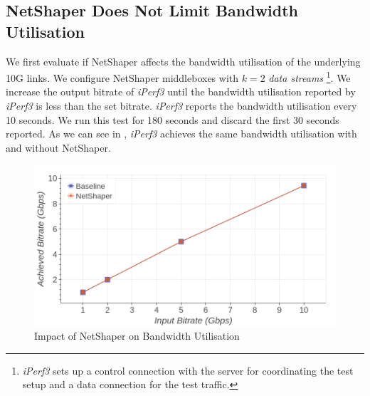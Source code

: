 \subsection{NetShaper Does Not Limit Bandwidth Utilisation}
\label{subsec:netshaper-evaluation-bw}

We first evaluate if NetShaper affects the bandwidth utilisation of the underlying 10G links.
We configure NetShaper middleboxes with $k = 2$ \textit{data streams}
\footnote{\textit{iPerf3} sets up a control connection with the server for coordinating the test setup and a data connection for the test traffic.}.
We increase the output bitrate of \textit{iPerf3} until the bandwidth utilisation reported by \textit{iPerf3} is less than the set bitrate.
\textit{iPerf3} reports the bandwidth utilisation every 10 seconds.
We run this test for 180 seconds and discard the first 30 seconds reported.
As we can see in , \textit{iPerf3} achieves the same bandwidth utilisation with and without NetShaper.

\begin{figure}[!htb]
    \centering
    \includegraphics[width=\columnwidth]{figures/netshaper/evaluation/bw.png}
    \caption{Impact of NetShaper on Bandwidth Utilisation}
    \label{fig:netshaper-eval-bw}
\end{figure}